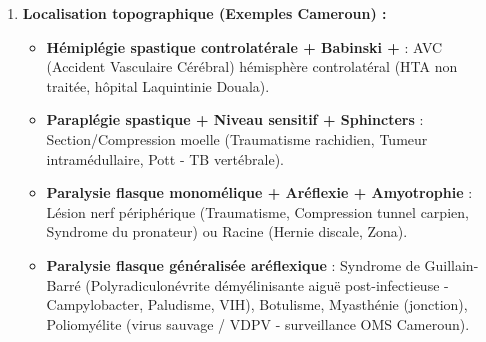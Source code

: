 \documentclass[11pt]{article}
\begin{document}
\begin{methode}
\begin{enumerate}
\begin{itemize}
        \item \textbf{Fasciculations} : Contractions spontanées unités motrices dénervées (hyperexcitabilité membrane motoneurone lésé).
        \item \textbf{Réflexes cutanés :} Abolis dans le territoire.
    \end{itemize}
    \item \textbf{Localisation topographique (Exemples Cameroun) :}
    \begin{itemize}
        \item \textbf{Hémiplégie spastique controlatérale + Babinski +} : AVC (Accident Vasculaire Cérébral) hémisphère controlatéral (HTA non traitée, hôpital Laquintinie Douala).
        \item \textbf{Paraplégie spastique + Niveau sensitif + Sphincters} : Section/Compression moelle (Traumatisme rachidien, Tumeur intramédullaire, Pott - TB vertébrale).
        \item \textbf{Paralysie flasque monomélique + Aréflexie + Amyotrophie} : Lésion nerf périphérique (Traumatisme, Compression tunnel carpien, Syndrome du pronateur) ou Racine (Hernie discale, Zona).
        \item \textbf{Paralysie flasque généralisée aréflexique} : Syndrome de Guillain-Barré (Polyradiculonévrite démyélinisante aiguë post-infectieuse - Campylobacter, Paludisme, VIH), Botulisme, Myasthénie (jonction), Poliomyélite (virus sauvage / VDPV - surveillance OMS Cameroun).
    \end{itemize}
\end{enumerate}
\end{methode}
\end{document}
